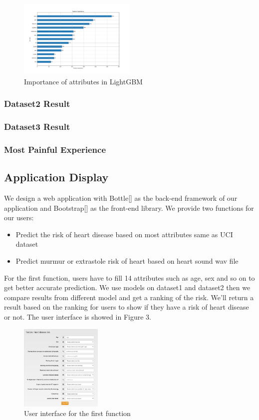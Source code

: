 \documentclass[letterpaper]{article} %
\begin{document}
\begin{figure}[!htbp]
\centering\includegraphics[width=0.5\textwidth]{dataset-1-impor}
\caption{Importance of attributes in LightGBM}
\label{fig:dataset-1-impor}
\end{figure}

\subsubsection{Dataset2 Result}

\subsubsection{Dataset3 Result}

\subsubsection{Most Painful Experience}

\subsection{Application Display}
We design a web application with Bottle[] as the back-end framework of our application and Bootstrap[] as the front-end library. We provide two functions for our users:
\begin{itemize}
\item Predict the risk of heart disease based on most attributes same as UCI dataset
\item Predict murmur or extrastole risk of heart based on heart sound wav file
\end{itemize}

For the first function, users have to fill 14 attributes such as age, sex and so on to get better accurate prediction. We use models on dataset1 and dataset2 then we compare results from different model and get a ranking of the risk. We'll return a result based on the ranking for users to show if they have a risk of heart disease or not. The user interface is showed in Figure 3.
\begin{figure}[!htbp]
\centering\includegraphics[width=0.35\textwidth]{dataset-1-ui}
\caption{User interface for the first function}
\label{fig:dataset-1-ui}
\end{figure}
\end{document}
